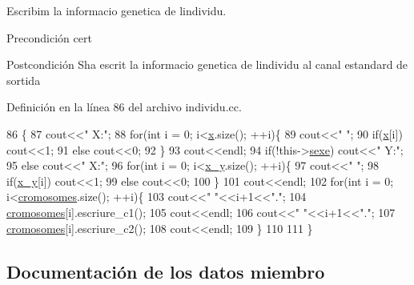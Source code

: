 Escribim la informacio genetica de l\textquotesingle{}individu. 

\begin{DoxyPrecond}{Precondición}
cert 
\end{DoxyPrecond}
\begin{DoxyPostcond}{Postcondición}
S\textquotesingle{}ha escrit la informacio genetica de l\textquotesingle{}individu al canal estandard de sortida 
\end{DoxyPostcond}


Definición en la línea 86 del archivo individu.\+cc.


\begin{DoxyCode}
86                                \{
87   cout<<\textcolor{stringliteral}{"  X:"};
88   \textcolor{keywordflow}{for}(\textcolor{keywordtype}{int} i = 0; i<\hyperlink{classindividu_a3c4abda8daead156b5519f69bd224fa9}{x}.size(); ++i)\{
89     cout<<\textcolor{stringliteral}{" "};
90     \textcolor{keywordflow}{if}(\hyperlink{classindividu_a3c4abda8daead156b5519f69bd224fa9}{x}[i]) cout<<1;
91     \textcolor{keywordflow}{else} cout<<0;
92   \}
93   cout<<endl;
94   \textcolor{keywordflow}{if}(!this->\hyperlink{classindividu_ab62faa6985cc0520c33a206fc5a89e37}{sexe}) cout<<\textcolor{stringliteral}{"  Y:"};
95   \textcolor{keywordflow}{else} cout<<\textcolor{stringliteral}{"  X:"};
96   \textcolor{keywordflow}{for}(\textcolor{keywordtype}{int} i = 0; i<\hyperlink{classindividu_a51eb7827fdd5bd5302e3c962fd719fc0}{x\_y}.size(); ++i)\{
97     cout<<\textcolor{stringliteral}{" "};
98     \textcolor{keywordflow}{if}(\hyperlink{classindividu_a51eb7827fdd5bd5302e3c962fd719fc0}{x\_y}[i]) cout<<1;
99     \textcolor{keywordflow}{else} cout<<0;
100   \}
101   cout<<endl;
102   \textcolor{keywordflow}{for}(\textcolor{keywordtype}{int} i = 0; i<\hyperlink{classindividu_ae5e0a83ff9e943cbcdf95b74069ad3a7}{cromosomes}.size(); ++i)\{
103     cout<<\textcolor{stringliteral}{"  "}<<i+1<<\textcolor{stringliteral}{"."};
104     \hyperlink{classindividu_ae5e0a83ff9e943cbcdf95b74069ad3a7}{cromosomes}[i].escriure\_c1();
105     cout<<endl;
106     cout<<\textcolor{stringliteral}{"  "}<<i+1<<\textcolor{stringliteral}{"."};
107     \hyperlink{classindividu_ae5e0a83ff9e943cbcdf95b74069ad3a7}{cromosomes}[i].escriure\_c2();
108     cout<<endl;
109   \}
110 
111 \}
\end{DoxyCode}


\subsection{Documentación de los datos miembro}
